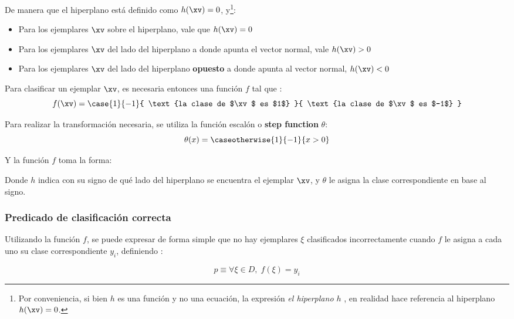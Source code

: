 De manera que el hiperplano está definido como $h(\xv)=0$, y\footnote{Por conveniencia, si bien $h$ es una función y no una ecuación, la expresión \textit{el hiperplano $h$ }, en realidad hace referencia al hiperplano $h(\xv)=0$.}:

\begin{itemize}
\item Para los ejemplares $\xv$ sobre el hiperplano, vale que $h(\xv)=0$
\item Para los ejemplares $\xv$ del lado del hiperplano a donde apunta el vector normal, vale $h(\xv)>0$
\item Para los ejemplares $\xv$ del lado del hiperplano \textbf{opuesto} a donde apunta al vector normal, $h(\xv)<0$
\end{itemize}


Para clasificar un ejemplar $\xv$, es necesaria entonces una función $f$ tal que :
\begin{equation}
 f(\xv)= \case{1}{-1}{ \text{la clase de $\xv$ es $1$} }{ \text{la clase de $\xv$ es $-1$} }
 \end{equation}

Para realizar la transformación necesaria, se utiliza la función escalón o \textbf{step function} $\theta$:
\begin{equation}
\theta(x) = \caseotherwise{1}{-1}{x> 0}
 \end{equation}


Y la función $f$ toma la forma:


Donde $h$ indica con su signo de qué lado del hiperplano se encuentra el ejemplar $\xv$, y $\theta$ le asigna la clase correspondiente en base al signo.

\subsubsection{Predicado de clasificación correcta}

Utilizando la función $f$, se puede expresar de forma simple que no hay ejemplares $\xi$ clasificados incorrectamente cuando $f$ le asigna a cada uno su clase correspondiente $y_i$, definiendo :

\begin{equation}
p \equiv \forall \xi \in D, \; f(\xi) = y_i
\end{equation}


